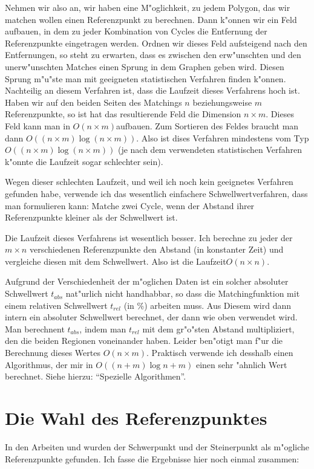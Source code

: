 Nehmen wir also an, wir haben eine M"oglichkeit, zu jedem Polygon, das wir matchen wollen einen Referenzpunkt zu berechnen. Dann k"onnen wir ein Feld aufbauen, in dem zu jeder Kombination von Cycles die Entfernung der Referenzpunkte eingetragen werden. Ordnen wir dieses Feld aufsteigend nach den Entfernungen, so steht zu erwarten, dass es zwischen den erw"unschten und den unerw"unschten Matches einen Sprung in dem Graphen geben wird. Diesen Sprung m"u"ste man mit geeigneten statistischen Verfahren finden k"onnen. Nachteilig an diesem Verfahren ist, dass die Laufzeit dieses Verfahrens hoch ist. Haben wir auf den beiden Seiten des Matchings $n$ beziehungsweise $m$ Referenzpunkte, so ist hat das resultierende Feld die Dimension $n\times m$. Dieses Feld kann man in $O(n\times m)$aufbauen. Zum Sortieren des Feldes braucht man dann $O((n\times m)\log(n\times m))$. Also ist dises Verfahren mindestens vom Typ $O((n\times m)\log(n\times m))$ (je nach dem verwendeten statistischen Verfahren k"onnte die Laufzeit sogar schlechter sein).

Wegen dieser schlechten Laufzeit, und weil ich noch kein geeignetes Verfahren gefunden habe, verwende ich das wesentlich einfachere Schwellwertverfahren, dass man formulieren kann: Matche zwei Cycle, wenn der Abstand ihrer Referenzpunkte kleiner als der Schwellwert ist. 

Die Laufzeit dieses Verfahrens ist wesentlich besser. Ich berechne zu jeder der $m\times n$ verschiedenen  Referenzpunkte den Abstand (in konstanter Zeit) und vergleiche diesen mit dem Schwellwert. Also ist die Laufzeit$O(n\times n)$.

Aufgrund der Verschiedenheit der m"oglichen Daten ist ein solcher absoluter Schwellwert $t_{abs}$ nat"urlich nicht handhabbar, so dass die Matchingfunktion mit einem relativen Schwellwert $t_{rel}$ (in \%) arbeiten muss. Aus Diesem wird dann intern ein absoluter Schwellwert berechnet, der dann wie oben verwendet wird. Man berechnent $t_{abs}$, indem man $t_{rel}$ mit dem gr"o"sten Abstand multipliziert, den die beiden Regionen voneinander haben. Leider ben"otigt man f"ur die Berechnung dieses Wertes $O(n\times m)$. Praktisch verwende ich desshalb einen Algorithmus, der mir in $O((n+m)\log{n+m})$ einen sehr "ahnlich Wert berechnet. Siehe hierzu: "`Spezielle Algorithmen"'.

\section{Die Wahl des Referenzpunktes}
In den Arbeiten \cite{AAR} und  \cite{AFRW} wurden der Schwerpunkt und der Steinerpunkt als m"ogliche Referenzpunkte gefunden. Ich fasse die Ergebnisse hier noch einmal zusammen:


